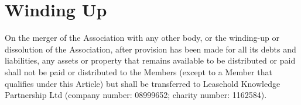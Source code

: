 \documentclass[10pt]{mk-articles-of-association}
\begin{document}


\section{Winding Up}

On the merger of the Association with any other body, or the
  winding-up or dissolution of the Association, after provision has
  been made for all its debts and liabilities, any assets or property
  that remains available to be distributed or paid shall not be paid
  or distributed to the Members (except to a Member that qualifies
  under this Article) but shall be transferred to Leasehold Knowledge
  Partnership Ltd (company number: 08999652; charity number: 1162584).
\end{document}
